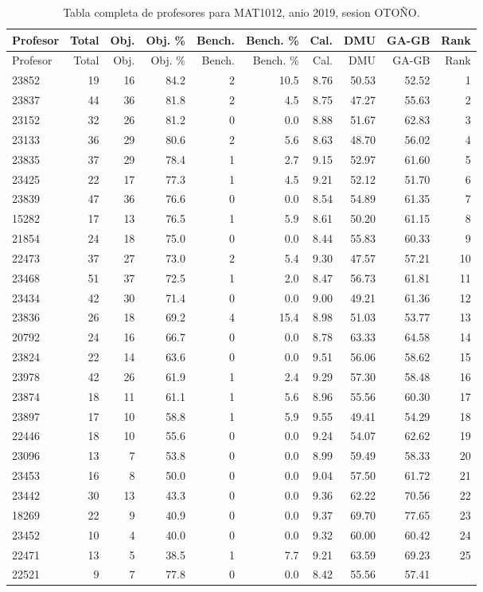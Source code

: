\begingroup
\scriptsize
\setlength{\tabcolsep}{3pt}
\begin{longtable}{lrrrrrrrrr}
\caption{Tabla completa de profesores para MAT1012, anio 2019, sesion OTOÑO.}\label{tab:prof-period-mat1012-2019-oto-o-especializado}\\
\toprule
Profesor & Total & Obj. & Obj. \% & Bench. & Bench. \% & Cal. & DMU & GA-GB & Rank \\
\midrule
\endfirsthead
\toprule
Profesor & Total & Obj. & Obj. \% & Bench. & Bench. \% & Cal. & DMU & GA-GB & Rank \\
\midrule
\endhead
23852 & 19 & 16 & 84.2 & 2 & 10.5 & 8.76 & 50.53 & 52.52 & 1 \\
23837 & 44 & 36 & 81.8 & 2 & 4.5 & 8.75 & 47.27 & 55.63 & 2 \\
23152 & 32 & 26 & 81.2 & 0 & 0.0 & 8.88 & 51.67 & 62.83 & 3 \\
23133 & 36 & 29 & 80.6 & 2 & 5.6 & 8.63 & 48.70 & 56.02 & 4 \\
23835 & 37 & 29 & 78.4 & 1 & 2.7 & 9.15 & 52.97 & 61.60 & 5 \\
23425 & 22 & 17 & 77.3 & 1 & 4.5 & 9.21 & 52.12 & 51.70 & 6 \\
23839 & 47 & 36 & 76.6 & 0 & 0.0 & 8.54 & 54.89 & 61.35 & 7 \\
15282 & 17 & 13 & 76.5 & 1 & 5.9 & 8.61 & 50.20 & 61.15 & 8 \\
21854 & 24 & 18 & 75.0 & 0 & 0.0 & 8.44 & 55.83 & 60.33 & 9 \\
22473 & 37 & 27 & 73.0 & 2 & 5.4 & 9.30 & 47.57 & 57.21 & 10 \\
23468 & 51 & 37 & 72.5 & 1 & 2.0 & 8.47 & 56.73 & 61.81 & 11 \\
23434 & 42 & 30 & 71.4 & 0 & 0.0 & 9.00 & 49.21 & 61.36 & 12 \\
23836 & 26 & 18 & 69.2 & 4 & 15.4 & 8.98 & 51.03 & 53.77 & 13 \\
20792 & 24 & 16 & 66.7 & 0 & 0.0 & 8.78 & 63.33 & 64.58 & 14 \\
23824 & 22 & 14 & 63.6 & 0 & 0.0 & 9.51 & 56.06 & 58.62 & 15 \\
23978 & 42 & 26 & 61.9 & 1 & 2.4 & 9.29 & 57.30 & 58.48 & 16 \\
23874 & 18 & 11 & 61.1 & 1 & 5.6 & 8.96 & 55.56 & 60.30 & 17 \\
23897 & 17 & 10 & 58.8 & 1 & 5.9 & 9.55 & 49.41 & 54.29 & 18 \\
22446 & 18 & 10 & 55.6 & 0 & 0.0 & 9.24 & 54.07 & 62.62 & 19 \\
23096 & 13 & 7 & 53.8 & 0 & 0.0 & 8.99 & 59.49 & 58.33 & 20 \\
23453 & 16 & 8 & 50.0 & 0 & 0.0 & 9.04 & 57.50 & 61.72 & 21 \\
23442 & 30 & 13 & 43.3 & 0 & 0.0 & 9.36 & 62.22 & 70.56 & 22 \\
18269 & 22 & 9 & 40.9 & 0 & 0.0 & 9.37 & 69.70 & 77.65 & 23 \\
23452 & 10 & 4 & 40.0 & 0 & 0.0 & 9.32 & 60.00 & 60.42 & 24 \\
22471 & 13 & 5 & 38.5 & 1 & 7.7 & 9.21 & 63.59 & 69.23 & 25 \\
22521 & 9 & 7 & 77.8 & 0 & 0.0 & 8.42 & 55.56 & 57.41 &  \\
\bottomrule
\end{longtable}
